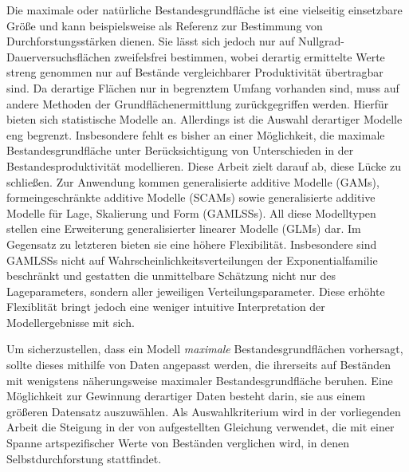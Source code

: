 {
  \newcommand{\mysectiontitle}{Zusammenfassung} %
  \markboth{\mysectiontitle{}}{} %

  \pagestyle{zusammenfassung}

  Die maximale oder natürliche Bestandesgrundfläche ist eine vielseitig einsetzbare Größe und kann beispielsweise als Referenz zur Bestimmung von Durchforstungsstärken dienen.  Sie lässt sich jedoch nur auf Nullgrad-Dauerversuchsflächen zweifelsfrei bestimmen, wobei derartig ermittelte Werte streng genommen nur auf Bestände vergleichbarer Produktivität übertragbar sind.  Da derartige Flächen nur in begrenztem Umfang vorhanden sind, muss auf andere Methoden der Grundflächenermittlung zurückgegriffen werden.  Hierfür bieten sich statistische Modelle an.  Allerdings ist die Auswahl derartiger Modelle eng begrenzt. Insbesondere fehlt es bisher an einer Möglichkeit, die maximale Bestandesgrundfläche unter Berücksichtigung von Unterschieden in der Bestandesproduktivität modellieren.  Diese Arbeit zielt darauf ab, diese Lücke zu schließen.  Zur Anwendung kommen generalisierte additive Modelle (GAMs), formeingeschränkte additive Modelle (SCAMs) sowie generalisierte additive Modelle für Lage, Skalierung und Form (GAMLSSs).  All diese Modelltypen stellen eine Erweiterung generalisierter linearer Modelle (GLMs) dar.  Im Gegensatz zu letzteren bieten sie eine höhere Flexibilität.  Insbesondere sind GAMLSSs nicht auf Wahrscheinlichkeitsverteilungen der Exponentialfamilie beschränkt und gestatten die unmittelbare Schätzung nicht nur des Lageparameters, sondern aller jeweiligen Verteilungsparameter.  Diese erhöhte Flexiblität bringt jedoch eine weniger intuitive Interpretation der Modellergebnisse mit sich.
  
  Um sicherzustellen, dass ein Modell \emph{maximale} Bestandesgrundflächen vorhersagt, sollte dieses mithilfe von Daten angepasst werden, die ihrerseits auf Beständen mit wenigstens näherungsweise maximaler Bestandesgrundfläche beruhen.  Eine Möglichkeit zur Gewinnung derartiger Daten besteht darin, sie aus einem größeren Datensatz auszuwählen.  Als Auswahlkriterium wird in der vorliegenden Arbeit die Steigung in der von \textcite{Reineke1933} aufgestellten Gleichung verwendet, die mit einer Spanne artspezifischer Werte von Beständen verglichen wird, in denen Selbstdurchforstung stattfindet.
  
}
